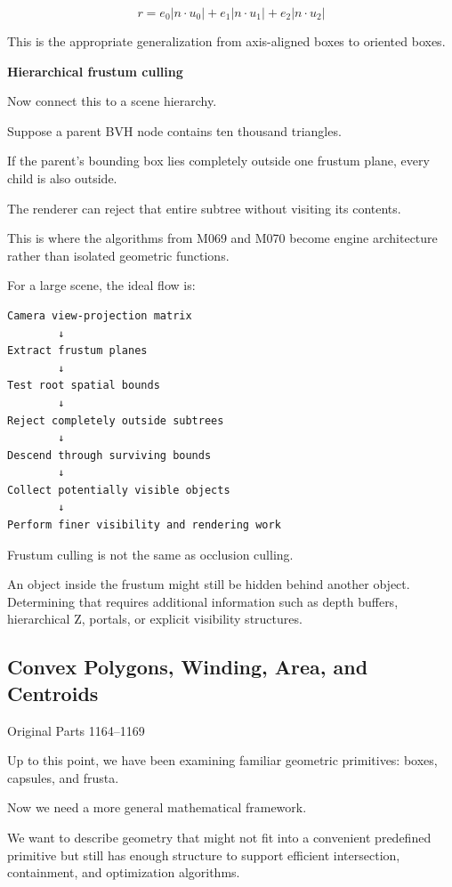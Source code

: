 \[
r= e_0|n\cdot u_0| + e_1|n\cdot u_1| + e_2|n\cdot u_2|
\]

This is the appropriate generalization from axis-aligned boxes to oriented boxes.

\textbf{Hierarchical frustum culling}

Now connect this to a scene hierarchy.

Suppose a parent BVH node contains ten thousand triangles.

If the parent's bounding box lies completely outside one frustum plane, every child is also outside.

The renderer can reject that entire subtree without visiting its contents.

This is where the algorithms from M069 and M070 become engine architecture rather than isolated geometric functions.

For a large scene, the ideal flow is:

\begin{verbatim}
Camera view-projection matrix
        ↓
Extract frustum planes
        ↓
Test root spatial bounds
        ↓
Reject completely outside subtrees
        ↓
Descend through surviving bounds
        ↓
Collect potentially visible objects
        ↓
Perform finer visibility and rendering work
\end{verbatim}

Frustum culling is not the same as occlusion culling.

An object inside the frustum might still be hidden behind another object. Determining that requires additional information such as depth buffers, hierarchical Z, portals, or explicit visibility structures.

\subsection{Convex Polygons, Winding, Area, and Centroids}\label{03-visual-computing-i-ch021-convex-polygons-winding-area-and-centroids}

\hypertarget{03-visual-computing-i-ch021-convex-polygons-winding-area-and-centroids}{}

Original Parts 1164--1169

Up to this point, we have been examining familiar geometric primitives: boxes, capsules, and frusta.

Now we need a more general mathematical framework.

We want to describe geometry that might not fit into a convenient predefined primitive but still has enough structure to support efficient intersection, containment, and optimization algorithms.

